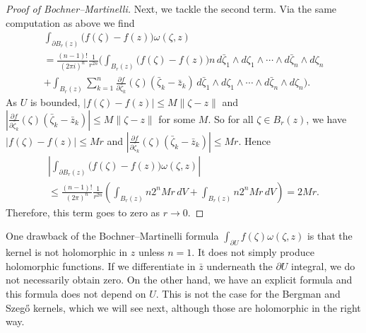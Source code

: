 \documentclass[12pt,openany]{book}
\newcommand{\snorm}[1]{\lVert {#1} \rVert}
\newcommand{\abs}[1]{\left\lvert {#1} \right\rvert}
\theoremstyle{plain}
\theoremstyle{remark}
\theoremstyle{definition}
\theoremstyle{exercise}
\theoremstyle{example}
\begin{document}
\begin{proof}[Proof of Bochner--Martinelli]
Next, we tackle the second term.
Via the same computation as above we find
\begin{multline*}
\int_{\partial B_r(z)}
\bigl(f(\zeta)-f(z)\bigr)
\omega(\zeta,z)
\\
=
\frac{(n-1)!}{{(2\pi i)}^n}\frac{1}{r^{2n}}
\Biggl(
\int_{B_r(z)}
\bigl(f(\zeta)-f(z)\bigr)
n
\,
d\bar{\zeta}_1 \wedge d\zeta_1 \wedge
\cdots \wedge
d\bar{\zeta}_n \wedge d\zeta_n
\\
+
\int_{B_r(z)}
\sum_{k=1}^n
\frac{\partial f}{\partial \bar{\zeta}_k}(\zeta)
(\bar{\zeta}_k-\bar{z}_k)
\,
d\bar{\zeta}_1 \wedge d\zeta_1 \wedge
\cdots \wedge
d\bar{\zeta}_n \wedge d\zeta_n \Biggr).
\end{multline*}
As $U$ is bounded, $\abs{f(\zeta)-f(z)} \leq M
\snorm{\zeta-z}$
and
$\abs{\frac{\partial f}{\partial \bar{\zeta}_k}(\zeta)
(\bar{\zeta}_k-\bar{z}_k)} \leq M \snorm{\zeta-z}$ for some $M$.
So for all $\zeta \in B_r(z)$,
we have
$\abs{f(\zeta)-f(z)} \leq Mr$
and $\abs{\frac{\partial f}{\partial \bar{\zeta}_k}(\zeta)
(\bar{\zeta}_k-\bar{z}_k)} \leq Mr$.
Hence
\begin{multline*}
\abs{
\int_{\partial B_r(z)}
\bigl(f(\zeta)-f(z)\bigr)
\omega(\zeta,z)
}
\\
\leq
\frac{(n-1)!}{{(2\pi)}^n}\frac{1}{r^{2n}}
\left(
\int_{B_r(z)}
n 2^n Mr \, dV
+
\int_{B_r(z)}
n 2^n Mr \, dV
\right)
=
2 M r .
\end{multline*}
Therefore, this term goes to zero as $r \to 0$.
\end{proof}

One drawback of the Bochner--Martinelli formula $\int_{\partial U} f(\zeta)
\omega(\zeta,z)$ is that the kernel is not
holomorphic in $z$ unless $n=1$.  It does not simply produce
holomorphic functions.  If we differentiate in $\bar{z}$ underneath the
$\partial U$ integral, we do not necessarily obtain zero.
On the other hand, we have an explicit formula and this formula does not
depend on $U$.  This is not the case for the Bergman and Szeg\H{o}
kernels, which we will see next, although those are holomorphic in the
right way.
\end{document}
